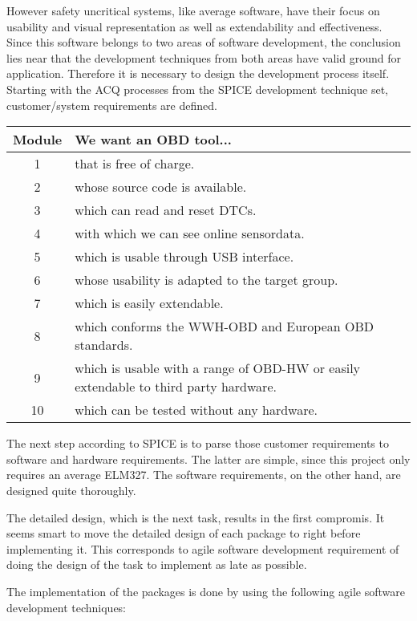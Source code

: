 However safety uncritical systems, like average software, have their focus on usability and visual representation as well as extendability and 
effectiveness. Since this software belongs to two areas of software development, the conclusion lies near that the development techniques 
from both areas have valid ground for application. Therefore it is necessary to design the development process itself. Starting with the ACQ 
processes from the SPICE development technique set, customer/system requirements are defined.

\begin{tabular}{| c | p{12cm} |}
 \hline
 \textbf{Module} & \textbf{We want an OBD tool...} \\
  \hline
  1 & that is free of charge. \\
  \hline
  2 & whose source code is available. \\
  \hline
  3 & which can read and reset DTCs. \\
  \hline
  4 & with which we can see online sensordata. \\
  \hline
  5 & which is usable through USB interface. \\
  \hline
  6 & whose usability is adapted to the target group. \\
  \hline
  7 & which is easily extendable. \\
  \hline
  8 & which conforms the WWH-OBD and European OBD standards. \\
  \hline
  9 & which is usable with a range of OBD-HW or easily extendable to third party hardware. \\
  \hline
  10 & which can be tested without any hardware. \\
  \hline
\end{tabular}

The next step according to SPICE is to parse those customer requirements to software and hardware requirements. The latter are simple, since 
this project only requires an average ELM327. The software requirements, on the other hand, are designed quite thoroughly.


The detailed design, which is the next task, results in the first compromis. It seems smart to move the detailed design of each package 
to right before implementing it. This corresponds to agile software development requirement of doing the design of the task to implement as late 
as possible.

The implementation of the packages is done by using the following agile software development techniques:

